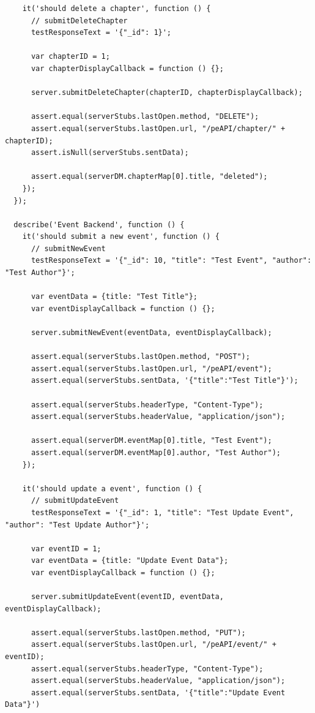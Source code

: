 \documentclass[12pt]{ucthesis}
\begin{document}
\begin{lstlisting}
    it('should delete a chapter', function () {
      // submitDeleteChapter
      testResponseText = '{"_id": 1}';

      var chapterID = 1;
      var chapterDisplayCallback = function () {};

      server.submitDeleteChapter(chapterID, chapterDisplayCallback);

      assert.equal(serverStubs.lastOpen.method, "DELETE");
      assert.equal(serverStubs.lastOpen.url, "/peAPI/chapter/" + chapterID);
      assert.isNull(serverStubs.sentData);

      assert.equal(serverDM.chapterMap[0].title, "deleted");
    });
  });

  describe('Event Backend', function () {
    it('should submit a new event', function () {
      // submitNewEvent
      testResponseText = '{"_id": 10, "title": "Test Event", "author": "Test Author"}';

      var eventData = {title: "Test Title"};
      var eventDisplayCallback = function () {};

      server.submitNewEvent(eventData, eventDisplayCallback);

      assert.equal(serverStubs.lastOpen.method, "POST");
      assert.equal(serverStubs.lastOpen.url, "/peAPI/event");
      assert.equal(serverStubs.sentData, '{"title":"Test Title"}');

      assert.equal(serverStubs.headerType, "Content-Type");
      assert.equal(serverStubs.headerValue, "application/json");

      assert.equal(serverDM.eventMap[0].title, "Test Event");
      assert.equal(serverDM.eventMap[0].author, "Test Author");
    });

    it('should update a event', function () {
      // submitUpdateEvent      
      testResponseText = '{"_id": 1, "title": "Test Update Event", "author": "Test Update Author"}';

      var eventID = 1;
      var eventData = {title: "Update Event Data"};
      var eventDisplayCallback = function () {};

      server.submitUpdateEvent(eventID, eventData, eventDisplayCallback);

      assert.equal(serverStubs.lastOpen.method, "PUT");
      assert.equal(serverStubs.lastOpen.url, "/peAPI/event/" + eventID);
      assert.equal(serverStubs.headerType, "Content-Type");
      assert.equal(serverStubs.headerValue, "application/json");
      assert.equal(serverStubs.sentData, '{"title":"Update Event Data"}')


\end{lstlisting}
\end{document}
